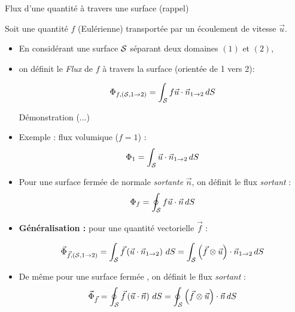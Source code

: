 \begin{frame}{Flux d'une quantité à travers une surface (rappel)}

\small

Soit une quantité $f$ (Eulérienne) transportée par un écoulement de vitesse $\vec{u}$.
\smallskip

\begin{itemize}

\item En considérant une surface $\cal S$ séparant deux domaines $(1)$ et $(2)$,

\smallskip

\item[] on définit le {\em Flux} de $f$ à travers la surface (orientée de 1 vers 2):

$$
\Phi_{f,  ({\cal S}, 1 \rightarrow 2)} = \int_{\cal S} f \vec{u} \cdot  \vec {n}_{1\rightarrow 2} \, dS
$$

{\color{green} Démonstration (...)} 

\pause 
\medskip

\pause
\medskip
\item Exemple : flux volumique ($f=1$) :
$$
\Phi_1 =  \int_{\cal S} \vec{u} \cdot  \vec {n}_{1\rightarrow 2} \, dS
$$

\item Pour une surface fermée de normale {\em sortante} $\vec{n}$, on définit le flux {\em sortant} :
$$
\Phi_{f} = \oint_{\cal S} f \vec{u} \cdot  \vec {n} \, dS
$$




\pause
\bigskip

\item {\bf Généralisation : } pour une quantité vectorielle $\vec{f}$ :
 
$$
\vec{\Phi}_{\vec{f},  ({\cal S}, 1 \rightarrow 2)} = \int_{\cal S} \vec{f} \left( \vec{u} \cdot  \vec {n}_{1\rightarrow 2} \right) \, dS
= \int_{\cal S} \left( \vec{f} \otimes \vec{u} \right) \cdot  \vec {n}_{1\rightarrow 2} \, dS
$$


\pause
\medskip
\item De même pour une surface fermée , on définit le flux {\em sortant} :
$$
\vec{\Phi}_{\vec{f}} = \oint_{\cal S} \vec{f} \left( \vec{u} \cdot  \vec {n} \right)\, dS
= \oint_{\cal S} \left( \vec{f} \otimes \vec{u} \right) \cdot  \vec {n} \, dS
$$

\end{itemize}
\end{frame}



